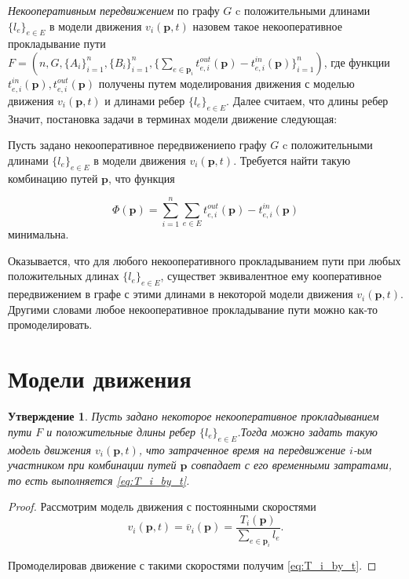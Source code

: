 \documentclass[12pt, a4paper]{article}
\newtheorem{state}{Утверждение}[section]
\begin{document}
\textit{Некооперативным передвижением} по графу $G$ c положительными длинами $\{l_e\}_{e \in E}$ в модели движения $v_i(\textbf{p}, t)$ назовем такое некооперативное прокладывание пути $F = (n, G, \{A_i\}_{i = 1}^{n}, \{B_i\}_{i = 1}^{n}, \{\sum_{e \in \textbf{p}_i} t_{e, i}^{out}(\textbf{p}) - t_{e, i}^{in}(\textbf{p})\}_{i = 1}^{n})$, где функции $t_{e, i}^{in}(\textbf{p}), t_{e, i}^{out}(\textbf{p})$ получены путем моделирования движения с моделью движения $v_i(\textbf{p}, t)$ и длинами ребер $\{l_e\}_{e \in E}$. Далее считаем, что длины ребер 
Значит, постановка задачи в терминах модели движение следующая:

Пусть задано некооперативное передвижениепо графу $G$ c положительными длинами $\{l_e\}_{e \in E}$ в модели движения $v_i(\textbf{p}, t)$.
Требуется найти такую комбинацию путей $\textbf{p}$, что функция 

\begin{equation}
\label{eq:target_task_end}
\Phi(\textbf{p}) =\sum \limits_{i = 1}^n \sum \limits_{e \in E} t_{e, i}^{out}(\textbf{p}) - t_{e, i}^{in}(\textbf{p})
\end{equation}
минимальна.

Оказывается, что для любого некооперативного прокладыванием пути при любых положительных длинах $\{l_e\}_{e \in E}$, существет эквивалентное ему кооперативное передвижением в графе с этими длинами в некоторой модели движения $v_i(\textbf{p}, t)$. Другими словами любое некооперативное прокладывание пути можно как-то промоделировать.

\newpage
\section{Модели движения}

\label{sec:models}

\begin{state}
	\label{state:eqv}
	Пусть задано некоторое некооперативное прокладыванием пути $F$ и положительные длины ребер  $\{l_e\}_{e \in E}$.Тогда можно задать такую модель движения $v_i(\textbf{p}, t)$, что затраченное время на передвижение $i$-ым участником при комбинации путей $\textbf{p}$ совпадает с его временными затратами, то есть выполняется \eqref{eq:T_i_by_t}.
	
\end{state}

\begin{proof}
Рассмотрим модель движения с постоянными скоростями  
$$v_i(\textbf{p}, t) = \overline{v}_i(\textbf{p}) = \frac{T_i (\textbf{p})}{\sum \limits_{e \in \textbf{p}_i} l_e}.$$

Промоделировав движение с такими скоростями получим \eqref{eq:T_i_by_t}.
\end{proof}
\end{document}
